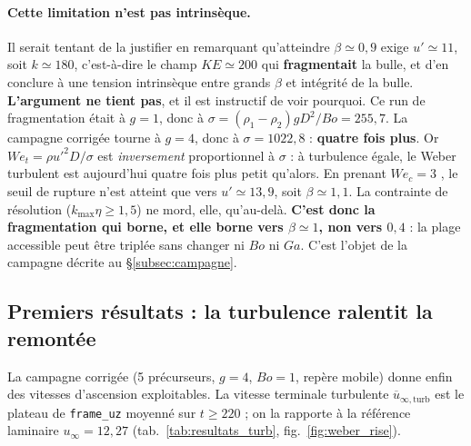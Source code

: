 \paragraph{Cette limitation n'est pas intrinsèque.} Il serait tentant de la justifier
en remarquant qu'atteindre $\beta\simeq0{,}9$ exige $u'\simeq11$, soit $k\simeq180$,
c'est-à-dire le champ $KE\simeq200$ qui \textbf{fragmentait} la bulle, et d'en
conclure à une tension intrinsèque entre grands $\beta$ et intégrité de la bulle.
\textbf{L'argument ne tient pas}, et il est instructif de voir pourquoi. Ce run de
fragmentation était à $g=1$, donc à $\sigma=(\rho_1-\rho_2)gD^2/Bo=255{,}7$. La
campagne corrigée tourne à $g=4$, donc à $\sigma=1022{,}8$ : \textbf{quatre fois
plus}. Or $We_t=\rho u'^2D/\sigma$ est \emph{inversement} proportionnel à $\sigma$ :
à turbulence égale, le Weber turbulent est aujourd'hui quatre fois plus petit
qu'alors. En prenant $We_c=3$ \cite{riviere2021}, le seuil de rupture n'est atteint
que vers $u'\simeq13{,}9$, soit $\beta\simeq1{,}1$. La contrainte de résolution
($k_{\max}\eta\ge1{,}5$) ne mord, elle, qu'au-delà. \textbf{C'est donc la
fragmentation qui borne, et elle borne vers $\beta\simeq1$, non vers $0{,}4$} : la
plage accessible peut être triplée sans changer ni $Bo$ ni $Ga$. C'est l'objet de la
campagne décrite au \S\ref{subsec:campagne}.


\subsection{Premiers résultats : la turbulence ralentit la remontée}
\label{subsec:resultats_turb}

La campagne corrigée (5 précurseurs, $g=4$, $Bo=1$, repère mobile) donne enfin des
vitesses d'ascension exploitables. La vitesse terminale turbulente
$\overline{u}_{\infty,\text{turb}}$ est le plateau de \texttt{frame\_uz} moyenné
sur $t\ge220$ ; on la rapporte à la référence laminaire $u_\infty=12{,}27$
(tab.~\ref{tab:resultats_turb}, fig.~\ref{fig:weber_rise}).

